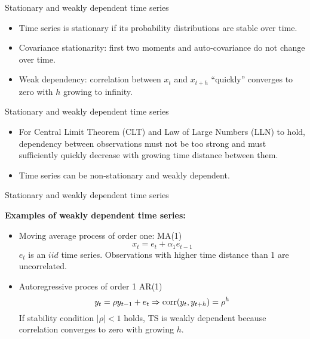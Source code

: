 \documentclass{beamer}
\begin{document}

\begin{frame}{Stationary and weakly dependent time series}
\begin{itemize}
\item Time series is stationary if its probability distributions are stable over time.

\vspace{0.5cm}

\item Covariance stationarity: first two moments and auto-covariance do not change over time.

\vspace{0.5cm}

\item Weak dependency: correlation between $x_t$ and $x_{t+h}$ ``quickly'' converges to zero with $h$ growing to infinity.
\end{itemize}
\end{frame}


\begin{frame}{Stationary and weakly dependent time series}
\begin{itemize}
\item For Central Limit Theorem (CLT) and Law of Large Numbers (LLN) to hold, dependency between observations must not be too strong and must sufficiently quickly decrease with growing time distance between them.

\vspace{0.5cm}

\item Time series can be non-stationary and weakly dependent.
\end{itemize}
\end{frame}


\begin{frame}{Stationary and weakly dependent time series}

\textbf{Examples of weakly dependent time series:}
\vspace{0.5cm}
\begin{itemize}
\item Moving average process of order one: MA(1)
$$x_t=e_t+\alpha_1 e_{t-1}$$
$e_t$ is an $\textit{iid}$ time series. Observations with higher time distance than 1 are uncorrelated.

\vspace{0.5cm}

\item Autoregressive proces of order 1 AR(1)
$$y_t=\rho y_{t-1} + e_t \Rightarrow \textnormal{corr}(y_t,y_{t+h})=\rho^h$$
If stability condition $|\rho|<1$ holds, TS is weakly dependent because correlation converges  to zero with growing $h$.
\end{itemize}

\end{frame}
\end{document}
